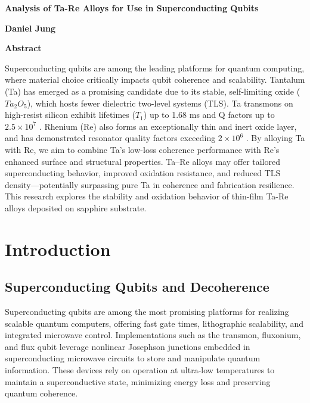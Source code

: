 \documentclass[12pt]{article}
\begin{document}
\newpage


\thispagestyle{plain}
\begin{center}
    \Large
    \textbf{Analysis of Ta-Re Alloys for Use in Superconducting Qubits}
        
    \vspace{0.4cm}
    \large
    \textbf{Daniel Jung}
       
    \vspace{0.9cm}
    \textbf{Abstract}
\normalsize
\end{center}
Superconducting qubits are among the leading platforms for quantum computing, where material choice critically impacts qubit coherence and scalability. Tantalum (Ta) has emerged as a promising candidate due to its stable, self-limiting oxide ($Ta_2O_5$), which hosts fewer dielectric two-level systems (TLS). Ta transmons on high-resist silicon exhibit lifetimes ($T_1$) up to 1.68 ms and Q factors up to $2.5 \times 10^7$ \cite{bland2025}. Rhenium (Re) also forms an exceptionally thin and inert oxide layer, and has demonstrated resonator quality factors exceeding $2\times 10^6$ \cite{crisa2025}. By alloying Ta with Re, we aim to combine Ta's low-loss coherence performance with Re's enhanced surface and structural properties. Ta--Re alloys may offer tailored superconducting behavior, improved oxidation resistance, and reduced TLS density---potentially surpassing pure Ta in coherence and fabrication resilience. This research explores the stability and oxidation behavior of thin-film Ta-Re alloys deposited on sapphire substrate.

\newpage


\tableofcontents

\newpage

\thispagestyle{plain}

\section{Introduction}

\subsection{Superconducting Qubits and Decoherence}
Superconducting qubits are among the most promising platforms for realizing scalable quantum computers, offering fast gate times, lithographic scalability, and integrated microwave control. Implementations such as the transmon, fluxonium, and flux qubit leverage nonlinear Josephson junctions embedded in superconducting microwave circuits to store and manipulate quantum information. These devices rely on operation at ultra-low temperatures to maintain a superconductive state, minimizing energy loss and preserving quantum coherence.
\end{document}
